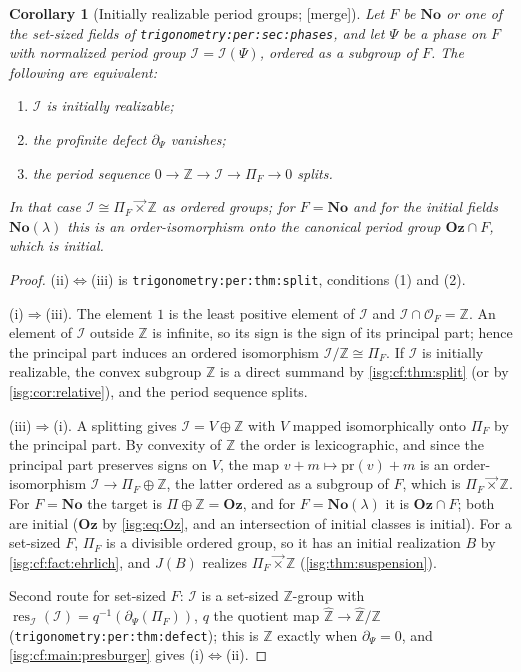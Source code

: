\documentclass[11pt]{article}
\newtheorem{corollary}[corollary]{Corollary}
\theoremstyle{definition}
\theoremstyle{remark}
\newcommand{\No}{\ensuremath{\mathbf{No}}}
\newcommand{\Oz}{\ensuremath{\mathbf{Oz}}}
\newcommand{\Z}{\mathbb{Z}}
\newcommand{\lex}{\mathbin{\overrightarrow{\times}}}
\newcommand{\Zhat}{\widehat{\Z}}
\newcommand{\res}{\operatorname{res}}
\newcommand{\replabel}[1]{\nolinkurl{#1}}
\begin{document}
\begin{corollary}[Initially realizable period groups; \textup{[merge]}]\label{isg:cf:cor:periods}
Let $F$ be $\No$ or one of the set-sized fields of
\replabel{trigonometry:per:sec:phases}, and let $\Psi$ be a phase on $F$
with normalized period group $\mathcal I=\mathcal I(\Psi)$, ordered as a
subgroup of $F$. The following are equivalent:
\begin{enumerate}[label=\textup{(\roman*)}]
\item $\mathcal I$ is initially realizable;
\item the profinite defect $\partial_\Psi$ vanishes;
\item the period sequence $0\to\Z\to\mathcal I\to\Pi_F\to0$ splits.
\end{enumerate}
In that case $\mathcal I\cong\Pi_F\lex\Z$ as ordered groups; for
$F=\No$ and for the initial fields $\No(\lambda)$ this is an
order-isomorphism onto the canonical period group $\Oz\cap F$, which is
initial.
\end{corollary}
\begin{proof}
(ii)$\Leftrightarrow$(iii) is \replabel{trigonometry:per:thm:split},
conditions (1) and (2).

(i)$\Rightarrow$(iii). The element $1$ is the least positive element of
$\mathcal I$ and $\mathcal I\cap\mathcal O_F=\Z$. An element of
$\mathcal I$ outside $\Z$ is infinite, so its sign is the sign of its
principal part; hence the principal part induces an ordered isomorphism
$\mathcal I/\Z\cong\Pi_F$. If $\mathcal I$ is initially realizable, the
convex subgroup $\Z$ is a direct summand by \cref{isg:cf:thm:split}
(or by \cref{isg:cor:relative}), and the period sequence splits.

(iii)$\Rightarrow$(i). A splitting gives $\mathcal I=V\oplus\Z$ with
$V$ mapped isomorphically onto $\Pi_F$ by the principal part. By
convexity of $\Z$ the order is lexicographic, and since the principal
part preserves signs on $V$, the map $v+m\mapsto\mathrm{pr}(v)+m$ is an
order-isomorphism $\mathcal I\to\Pi_F\oplus\Z$, the latter ordered as a
subgroup of $F$, which is $\Pi_F\lex\Z$. For $F=\No$ the target is
$\Pi\oplus\Z=\Oz$, and for $F=\No(\lambda)$ it is $\Oz\cap F$; both are
initial ($\Oz$ by \eqref{isg:eq:Oz}, and an intersection of initial
classes is initial). For a set-sized $F$, $\Pi_F$ is a divisible ordered
group, so it has an initial realization $B$ by
\cref{isg:cf:fact:ehrlich}, and $J(B)$ realizes $\Pi_F\lex\Z$
(\cref{isg:thm:suspension}).

Second route for set-sized $F$: $\mathcal I$ is a set-sized $\Z$-group
with $\res_{\mathcal I}(\mathcal I)=q^{-1}(\partial_\Psi(\Pi_F))$, $q$
the quotient map $\Zhat\to\Zhat/\Z$
(\replabel{trigonometry:per:thm:defect}); this is $\Z$ exactly when
$\partial_\Psi=0$, and \cref{isg:cf:main:presburger} gives
(i)$\Leftrightarrow$(ii).
\end{proof}
\end{document}
